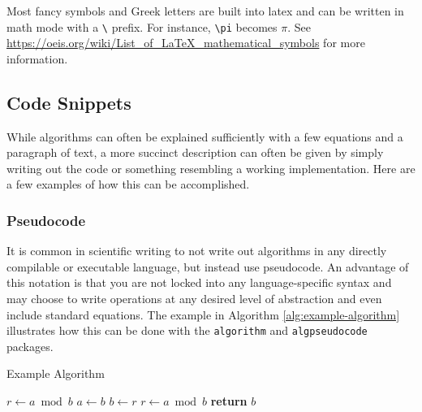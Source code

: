 Most fancy symbols and Greek letters are built into latex and can be written in math mode with a \verb|\| prefix.
For instance, \verb|\pi| becomes $\pi$.
See \url{https://oeis.org/wiki/List_of_LaTeX_mathematical_symbols} for more information.






\subsection{Code Snippets}

While algorithms can often be explained sufficiently with a few equations and a paragraph of text, a more succinct description can often be given by simply writing out the code or something resembling a working implementation.
Here are a few examples of how this can be accomplished.

\subsubsection{Pseudocode}

It is common in scientific writing to not write out algorithms in any directly compilable or executable language, but instead use pseudocode.
An advantage of this notation is that you are not locked into any language-specific syntax and may choose to write operations at any desired level of abstraction and even include standard equations.
The example in Algorithm \ref{alg:example-algorithm} illustrates how this can be done with the \verb|algorithm| and \verb|algpseudocode| packages.

\begin{algorithm}
    \caption{Example Algorithm}
    \label{alg:example-algorithm}
    \begin{algorithmic}
        \State $r\gets a\bmod b$
        \State $a\gets b$
        \State $b\gets r$
        \State $r\gets a\bmod b$
        \EndWhile\label{euclidendwhile}
        \State \textbf{return} $b$
        \EndProcedure
    \end{algorithmic}
\end{algorithm}


